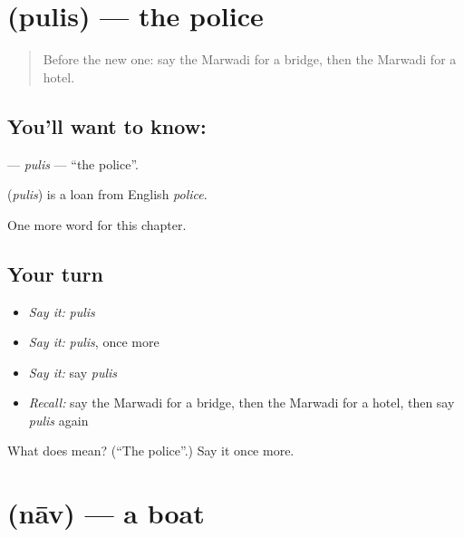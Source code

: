 \section[\texorpdfstring{\mw{पुलिस} (pulis)}{पुलिस (pulis)}]{ (pulis) — the police}

\label{lesson:MW-C83-pulis}



\begin{quote}
Before the new one: say the Marwadi for a bridge, then the Marwadi for a hotel.
\end{quote}

\subsection*{You'll want to know: }
\textbf{} — \emph{pulis} — \textquotedblleft{}the police\textquotedblright{}.

\begin{cousinweb}
\textbf{} (\emph{pulis}) is a loan from English \emph{police}.
\end{cousinweb}

\begin{grammarlens}[title={What you've built}]
One more word for this chapter.
\end{grammarlens}

\subsection*{Your turn}
\begin{itemize}
\raggedright
  \item \emph{Say it:} \emph{pulis}
  \item \emph{Say it:} \emph{pulis}, once more
  \item \emph{Say it:} say \emph{pulis}
  \item \emph{Recall:} say the Marwadi for a bridge, then the Marwadi for a hotel, then say \emph{pulis} again
\end{itemize}

\begin{tcolorbox}[breakable,colback=teal!4,colframe=teal!35!black,title={Before you move on}]
What does  mean? (\textquotedblleft{}The police\textquotedblright{}.) Say it once more.
\end{tcolorbox}
\section[\texorpdfstring{\mw{नाव} (nāv)}{नाव (nāv)}]{ (nāv) — a boat}

